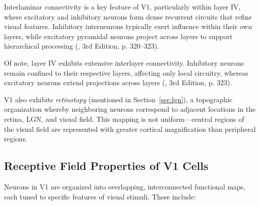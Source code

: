 Interlaminar connectivity is a key feature of V1, particularly within layer IV, where excitatory and inhibitory neurons form dense recurrent circuits that refine visual features. Inhibitory interneurons typically exert influence within their own layers, while excitatory pyramidal neurons project across layers to support hierarchical processing (\citet{bear2020neuroscience}, 3rd Edition, p. 320--323).

Of note, layer IV exhibits extensive interlayer connectivity. Inhibitory neurons remain confined to their respective layers, affecting only local circuitry, whereas excitatory neurons extend projections across layers (\citet{bear2020neuroscience}, 3rd Edition, p. 323).

V1 also exhibits \emph{retinotopy} (mentioned in Section~\ref{sec:lgn}), a topographic organization whereby neighboring neurons correspond to adjacent locations in the retina, LGN, and visual field. This mapping is not uniform—central regions of the visual field are represented with greater cortical magnification than peripheral regions.

\subsection{Receptive Field Properties of V1 Cells}
\label{subsec:receptive_field}

Neurons in V1 are organized into overlapping, interconnected functional maps, each tuned to specific features of visual stimuli. These include:

